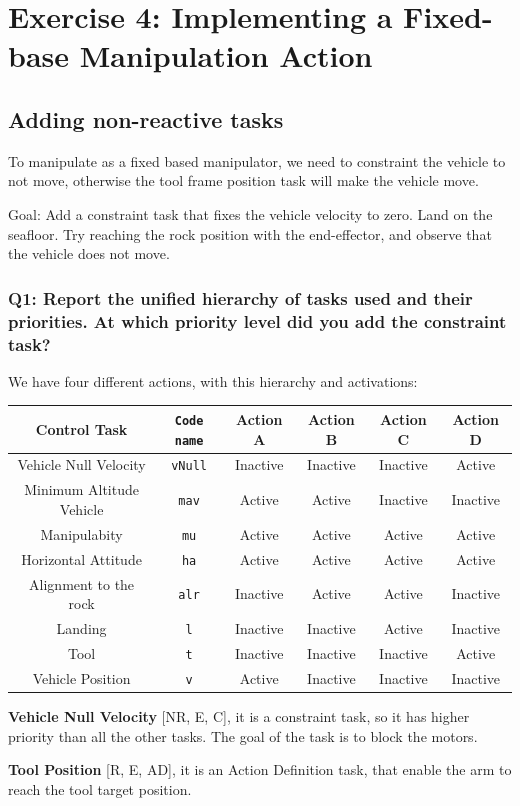 \documentclass{article}
\begin{document}
\clearpage
\section{Exercise 4: Implementing a Fixed-base Manipulation Action}
\subsection{Adding non-reactive tasks} \label{subsec:non-react}
To manipulate as a fixed based manipulator, we need to constraint the vehicle to not move, otherwise the tool frame position task will make the vehicle move.

Goal: Add a constraint task that fixes the vehicle velocity to zero. Land on the seafloor. Try reaching the rock position with the end-effector, and observe that the vehicle does not move.

\subsubsection{Q1: Report the unified hierarchy of tasks used and their priorities. At which priority level did you add the constraint task?}
We have four different actions, with this hierarchy and activations:
\begin{center}
\begin{tabular}{ | c | c | c | c | c | c |}
\hline
 Control Task & \texttt{Code name} & Action A & Action B & Action C & Action D\\
 \hline
 Vehicle Null Velocity & \texttt{vNull} & Inactive & Inactive & Inactive & Active\\
 Minimum Altitude Vehicle &  \texttt{mav} & Active & Active & Inactive & Inactive \\  
 Manipulabity &  \texttt{mu} & Active & Active & Active & Active  \\
 Horizontal Attitude &  \texttt{ha} & Active & Active & Active & Active\\
 Alignment to the rock & \texttt{alr} & Inactive & Active & Active & Inactive \\
 Landing & \texttt{l} &Inactive & Inactive & Active & Inactive\\
 Tool  &  \texttt{t} & Inactive & Inactive & Inactive & Active\\
 Vehicle Position &  \texttt{v} &Active & Inactive & Inactive & Inactive\\
 \hline
\end{tabular}
\end{center}
\begin{description}
\item \textbf{Vehicle Null Velocity} [NR, E, C], it is a constraint task, so it has higher priority than all the other tasks. The goal of the task is to block the motors.
\item \textbf{Tool Position} [R, E, AD], it is an Action Definition task, that enable the arm to reach the tool target position. 
\end{description}
\end{document}
